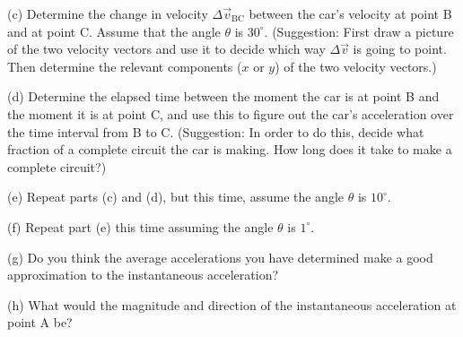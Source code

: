 \vfil\eject

(c) Determine the change in velocity $\Delta {\vec v}_\mathrm{BC}$ between the
car's velocity at point B and at point C.  Assume that the angle $\theta$
is $30^\circ$.  (Suggestion: First draw a picture of the two
velocity vectors and use it to decide which way
$\Delta{\vec v}$ is going to point.  Then determine the relevant
components ($x$ or $y$) of the two velocity vectors.)

\vfil

(d) Determine the elapsed time between the moment the car is at
point B and the moment it is at point C, and use this to figure out
the car's acceleration over the time interval from B to C.
(Suggestion: In order to do this, decide what fraction of a complete
circuit the car is making.  How long does it take to make a complete circuit?)

\vfil\eject

(e) Repeat parts (c) and (d), but this time, assume the angle $\theta$ is 
$10^\circ$.

\vfil

(f) Repeat part (e) this time assuming the angle $\theta$ is 
$1^\circ$.

\vfil

(g) Do you think the average accelerations you have determined make a good
approximation to the instantaneous acceleration?

\vskip 0.8in

(h) What would the magnitude and direction of the instantaneous acceleration
at point A be?

\vskip 0.8in\eject

